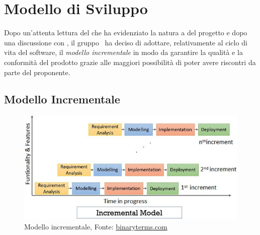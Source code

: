 \section{Modello di Sviluppo}
\label{modello_di_sviluppo}
Dopo un'attenta lettura del  che ha evidenziato la natura a  del progetto e dopo una discussione con \Proponente, il gruppo \Gruppo\ ha deciso di adottare, relativamente al ciclo di vita del software, il \textit{modello incrementale} in modo da garantire la qualità e la conformità del prodotto grazie alle maggiori possibilità di poter avere riscontri da parte del proponente. 

\subsection{Modello Incrementale}

\begin{figure}[ht]
    \centering
    \includegraphics[width=\textwidth]{../../Immagini/ModelloIncrementale}
    \caption{Modello incrementale, Fonte: \href{https://binaryterms.com/incremental-development-model.html}{binaryterms.com}}
    \label{fig:modello_incrementale}
\end{figure}

